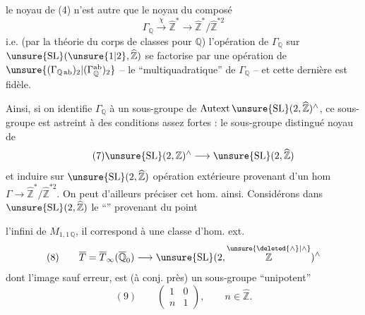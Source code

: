 le noyau de (4) n'est autre que le
noyau du composé
\[
\tag{6}
\Gamma_{\mathbb Q}\xrightarrow{\chi}\widehat{\mathbb Z}^{*}
\longrightarrow\widehat{\mathbb Z}^{*}/\widehat{\mathbb Z}^{*2}
\]
i.e. (par la théorie du corps de classes pour
$\mathbb Q$) l'opération  de $\Gamma_{\mathbb Q}$ sur
$\unsure{\mathrm{SL}}(\unsure{1|2},\widehat{\mathbb Z})$ se
factorise par une opération  de
$\unsure{(\Gamma_{\mathbb Q\,\mathrm{ab}})_2|(\Gamma_{\mathbb Q}^{\mathrm{ab}})_2}$ -- le
 ``multiquadratique'' de $\Gamma_{\mathbb Q}$ -- et cette
dernière est fidèle.


Ainsi, si on identifie $\Gamma_{\mathbb Q}$ 
à un sous-groupe de $\mathrm{Autext}\,\unsure{\mathrm{SL}}(2,\widehat{\mathbb Z})^{\wedge}$,
ce sous-groupe \inserted{$\unsure{\Gamma}$} est astreint à des
conditions assez fortes :  
le sous-groupe distingué noyau de
\[
\tag{7}
\unsure{\mathrm{SL}}(2,\mathbb Z)^{\wedge}\longrightarrow
\unsure{\mathrm{SL}}(2,\widehat{\mathbb Z})
\]
et induire sur $\unsure{\mathrm{SL}}(2,\widehat{\mathbb Z})$
 opération extérieure
provenant d'un hom $\Gamma\longrightarrow
\widehat{\mathbb Z}^{*}/\widehat{\mathbb Z}^{*2}$.
On peut d'ailleurs préciser cet hom.
ainsi. Considérons dans $\unsure{\mathrm{SL}}(2,\widehat{\mathbb Z})$ le
``'' provenant du point 


l'infini de $M_{1,1\,\mathbb Q}$, il correspond
à une classe d'hom. ext.
\[
(8)\qquad
\overline T=\overline T_{\infty}(\overline{\mathbb Q}_{0})
\longrightarrow
\unsure{\mathrm{SL}}(2,\overset{\unsure{\deleted{\wedge}|\wedge}}{\mathbb Z})^{\wedge}
\]
dont l'image 
sauf erreur, est (à conj. près) un sous-groupe ``unipotent''
\[
(9)\qquad
\left(\begin{array}{cc}1&0\\ n&1\end{array}\right),
\qquad n\in\widehat{\mathbb Z}.
\]

